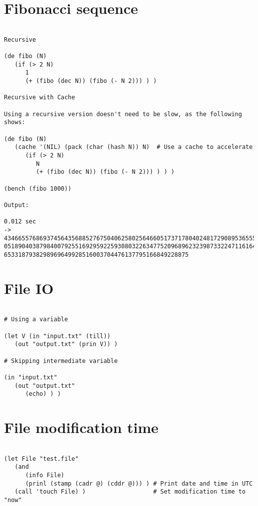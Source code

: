 \section*{Fibonacci sequence}

\begin{verbatim}

Recursive

(de fibo (N)
   (if (> 2 N)
      1
      (+ (fibo (dec N)) (fibo (- N 2))) ) )

Recursive with Cache

Using a recursive version doesn't need to be slow, as the following shows:

(de fibo (N)
   (cache '(NIL) (pack (char (hash N)) N)  # Use a cache to accelerate
      (if (> 2 N)
         N
         (+ (fibo (dec N)) (fibo (- N 2))) ) ) )

(bench (fibo 1000))

Output:

0.012 sec
-> 43466557686937456435688527675040625802564660517371780402481729089536555417949
05189040387984007925516929592259308032263477520968962323987332247116164299644090
6533187938298969649928516003704476137795166849228875

\end{verbatim}

\section*{File IO}

\begin{verbatim}

# Using a variable

(let V (in "input.txt" (till))
   (out "output.txt" (prin V)) )

# Skipping intermediate variable

(in "input.txt"
   (out "output.txt"
      (echo) ) )

\end{verbatim}

\section*{File modification time}

\begin{verbatim}

(let File "test.file"
   (and
      (info File)
      (prinl (stamp (cadr @) (cddr @))) ) # Print date and time in UTC
   (call 'touch File) )                   # Set modification time to "now"

\end{verbatim}

